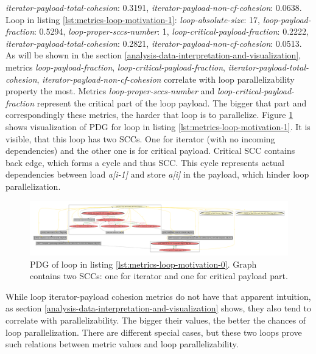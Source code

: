 \textit{iterator-payload-total-cohesion}: 0.3191,
\textit{iterator-payload-non-cf-cohesion}: 0.0638.\newline 
\null\qquad Loop in listing \ref{lst:metrics-loop-motivation-1}: \textit{loop-absolute-size}: 17, \textit{loop-payload-fraction}: 0.5294, \textit{loop-proper-sccs-number}: 1, \textit{loop-critical-payload-fraction}: 0.2222,
\textit{iterator-payload-total-cohesion}: 0.2821,
\textit{iterator-payload-non-cf-cohesion}: 0.0513.\newline
\null\qquad As will be shown in the section \ref{analysis-data-interpretation-and-visualization}, metrics \textit{loop-payload-fraction}, \textit{loop-critical-payload-fraction}, \textit{iterator-payload-total-cohesion}, \textit{iterator-payload-non-cf-cohesion} correlate with loop parallelizability property the most. Metrics \textit{loop-proper-sccs-number} and \textit{loop-critical-payload-fraction} represent the critical part of the loop payload. The bigger that part and correspondingly these metrics, the harder that loop is to parallelize. Figure \ref{metrics-use-pdg-0} shows visualization of PDG for loop in listing \ref{lst:metrics-loop-motivation-1}. It is visible, that this loop has two SCCs. One for iterator (with no incoming dependencies) and the other one is for critical payload. Critical SCC contains back edge, which forms a cycle and thus SCC. This cycle represents actual dependencies between load \textit{a[i-1]} and store \textit{a[i]} in the payload, which hinder loop parallelization.\newline
\begin{figure}[htb]
\centering
\includegraphics[width=\linewidth]{figs/metrics-use-pdg-0.pdf}
\caption{PDG of loop in listing \ref{lst:metrics-loop-motivation-0}. Graph contains two SCCs: one for iterator and one for critical payload part.}
\label{metrics-use-pdg-0}
\end{figure}
\null\qquad While loop iterator-payload cohesion metrics do not have that apparent intuition, as section \ref{analysis-data-interpretation-and-visualization} shows, they also tend to correlate with parallelizability. The bigger their values, the better the chances of loop parallelization. There are different special cases, but these two loops prove such relations between metric values and loop parallelizability.\newline
